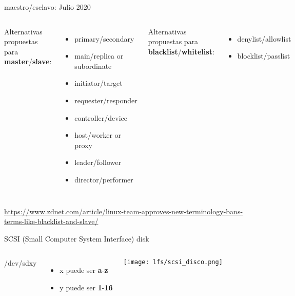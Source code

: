 \begin{frame}[c]{maestro/esclavo: Julio 2020}
  \begin{columns}[t]
      Alternativas propuestas para \\
      \textbf{master}/\textbf{slave}:

      \vspace{\baselineskip}
      \begin{itemize}
        \item primary/secondary
        \item main/replica or subordinate
        \item initiator/target
        \item requester/responder
        \item controller/device
        \item host/worker or proxy
        \item leader/follower
        \item director/performer
      \end{itemize}
      Alternativas propuestas para \textbf{blacklist}/\textbf{whitelist}:

      \vspace{\baselineskip}
      \begin{itemize}
        \item denylist/allowlist
        \item blocklist/passlist
      \end{itemize}
  \end{columns}

  \vspace{\baselineskip}
  {\footnotesize
  \href{https://www.zdnet.com/article/linux-team-approves-new-terminology-bans-terms-like-blacklist-and-slave/}
  {https://www.zdnet.com/article/linux-team-approves-new-terminology-bans-terms-like-blacklist-and-slave/}
  }
\end{frame}

\begin{frame}[c]{SCSI (Small Computer System Interface) disk}

  \begin{columns}
      {\huge /dev/sd{\color{red}x}{\color{blue}y}}
      \begin{itemize}
        \item {\color{red}x} puede ser \textbf{a}-\textbf{z}
        \item {\color{blue}y} puede ser \textbf{1}-\textbf{16}
      \end{itemize}
      \begin{center}
        \texttt{[image: lfs/scsi\_disco.png]}
      \end{center}
  \end{columns}
\end{frame}

